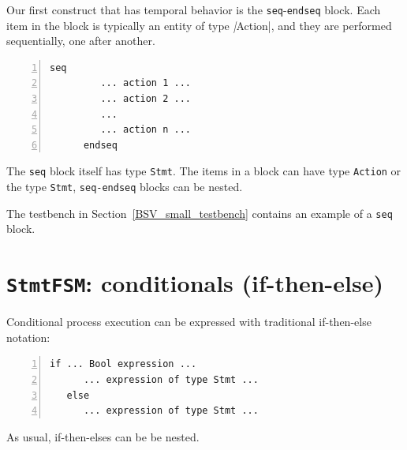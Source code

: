 Our first construct that has temporal behavior is the
\verb|seq|-\verb|endseq| block.  Each item in the block is typically
an entity of type \emph|Action|, and they are performed sequentially,
one after another.

{\small
\begin{Verbatim}[frame=single, numbers=left]
      seq
         ... action 1 ...
         ... action 2 ...
         ...
         ... action n ...
      endseq
\end{Verbatim}
}


The \verb|seq| block itself has type \verb|Stmt|.  The items in a
block can have type \verb|Action| or the type \verb|Stmt|, {\ie}
\verb|seq-endseq| blocks can be nested.

The testbench in Section~\ref{BSV_small_testbench} contains an example
of a \verb|seq| block.


\section{{\tt StmtFSM}: conditionals (if-then-else)}


Conditional process execution can be expressed with traditional
if-then-else notation:

{\small
\begin{Verbatim}[frame=single, numbers=left]
   if ... Bool expression ...
      ... expression of type Stmt ...
   else
      ... expression of type Stmt ...
\end{Verbatim}
}

As usual, if-then-elses can be be nested.

\vspace{2ex}

